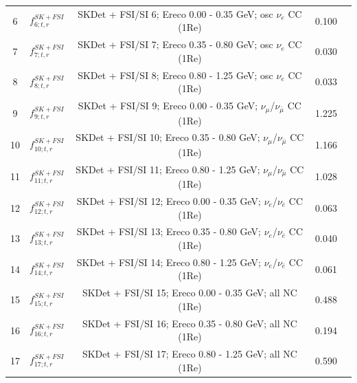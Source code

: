 {\begin{table}
\begin{tabular}{| c | c | c | c | c |}
6     &  $f_{6; t, r}^{SK+FSI}$    & SKDet + FSI/SI  6; Ereco 0.00 - 0.35 GeV; osc $\nu_e$ CC (1Re)                   & 0.100      \\ 
7      &  $f_{7; t, r}^{SK+FSI}$   & SKDet + FSI/SI  7; Ereco 0.35 - 0.80 GeV; osc $\nu_e$ CC (1Re)                   & 0.030      \\ 
8      &  $f_{8; t, r}^{SK+FSI}$   & SKDet + FSI/SI  8; Ereco 0.80 - 1.25 GeV; osc $\nu_e$ CC (1Re)                   & 0.033      \\ 
9      &  $f_{9; t, r}^{SK+FSI}$   & SKDet + FSI/SI  9; Ereco 0.00 - 0.35 GeV; $\nu_{\mu}$/$\nu_{\bar{\mu}}$ CC (1Re)                     & 1.225      \\ 
10    &  $f_{10; t, r}^{SK+FSI}$    & SKDet + FSI/SI 10; Ereco 0.35 - 0.80 GeV; $\nu_{\mu}$/$\nu_{\bar{\mu}}$ CC (1Re)                     & 1.166      \\ 
11    &   $f_{11; t, r}^{SK+FSI}$   & SKDet + FSI/SI 11; Ereco 0.80 - 1.25 GeV; $\nu_{\mu}$/$\nu_{\bar{\mu}}$ CC (1Re)                     & 1.028      \\ 
12    &  $f_{12; t, r}^{SK+FSI}$    & SKDet + FSI/SI 12; Ereco 0.00 - 0.35 GeV; $\nu_{e}$/$\nu_{\bar{e}}$ CC (1Re)                       & 0.063      \\ 
13    &  $f_{13; t, r}^{SK+FSI}$    & SKDet + FSI/SI 13; Ereco 0.35 - 0.80 GeV; $\nu_{e}$/$\nu_{\bar{e}}$  CC (1Re)                       & 0.040      \\ 
14    &  $f_{14; t, r}^{SK+FSI}$    & SKDet + FSI/SI 14; Ereco 0.80 - 1.25 GeV; $\nu_{e}$/$\nu_{\bar{e}}$ CC (1Re)                       & 0.061      \\ 
15    &  $f_{15; t, r}^{SK+FSI}$    & SKDet + FSI/SI 15; Ereco 0.00 - 0.35 GeV; all NC (1Re)                              & 0.488      \\ 
16    &  $f_{16; t, r}^{SK+FSI}$    & SKDet + FSI/SI 16; Ereco  0.35 - 0.80 GeV; all NC (1Re)                              & 0.194      \\ 
17    &  $f_{17; t, r}^{SK+FSI}$    & SKDet + FSI/SI 17; Ereco 0.80 - 1.25 GeV; all NC (1Re)                              & 0.590      \\ 


\end{tabular}
\end{table}}
